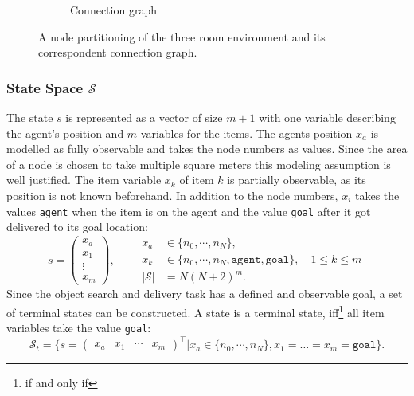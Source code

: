 \begin{figure}
\begin{subfigure}[b]{0.48\textwidth}
        \caption{Connection graph}
        \label{subfig:nodeconnection}
    \end{subfigure}
    \caption{A node partitioning of the three room environment and its correspondent connection graph.}
    \label{fig:nodes}
\end{figure}
\subsubsection{State Space $\mathcal{S}$}
The state $s$ is represented as a vector of size $m+1$ with one variable describing the agent's position and $m$ variables for the items. The agents position $x_a$ is modelled as fully observable and takes the node numbers as values. Since the area of a node is chosen to take multiple square meters this modeling assumption is well justified. The item variable $x_k$ of item $k$ is partially observable, as its position is not known beforehand. In addition to the node numbers, $x_i$ takes the values \texttt{agent} when the item is on the agent and the value \texttt{goal} after it got delivered to its goal location:
\begin{equation}
    s=\begin{pmatrix} x_a \\ x_1 \\ \vdots \\ x_m \end{pmatrix}, \qquad \begin{aligned} x_a&\in\{n_0, \cdots, n_N\},\\ 
    x_k &\in \{n_0, \cdots, n_N, \texttt{agent}, \texttt{goal}\}, \quad 1 \leq k \leq m \\
    |\mathcal{S}| &= N(N+2)^m. \end{aligned}
\end{equation}
Since the object search and delivery task has a defined and observable goal, a set of terminal states can be constructed. A state is a terminal state, iff\footnote{if and only if} all item variables take the value \texttt{goal}:
\begin{equation}\label{eq:s_t}
    \mathcal{S}_t = \{s=\begin{pmatrix} x_a & x_1 & \cdots & x_m \end{pmatrix}^\intercal | x_a\in \{n_0, \cdots, n_N\}, x_1=\ldots=x_m=\texttt{goal}\}.
\end{equation}
